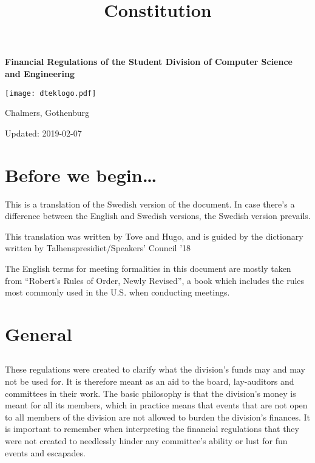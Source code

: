 \documentclass[a4paper]{dtek}
\title{Constitution}
\newcommand{\sdocsae}{Student Division of Computer Science and Engineering~}
\newcommand{\updated}{2019-02-07} %
\begin{document}
\makeheadfoot

\vspace*{\fill}
\begin{center}
{\Huge \textbf{Financial Regulations of the \sdocsae}}
\par\bigskip
\texttt{[image: dteklogo.pdf]}
\par\bigskip
{\LARGE Chalmers, Gothenburg}
\end{center}
\vspace*{\fill}
\begin{center}
{\LARGE Updated: \updated}
\end{center}
\vspace*{\fill}


\newpage
\setcounter{tocdepth}{1}
\tableofcontents
\newpage


\setcounter{section}{-1}
\section{Before we begin\dots}
This is a translation of the Swedish version of the document. In case there's a difference between the English and Swedish versions, the Swedish version prevails.

This translation was written by Tove and Hugo, and is guided by the dictionary written by Talhenspresidiet/Speakers' Council '18

The English terms for meeting formalities in this document are mostly taken from ``Robert's Rules of Order, Newly Revised'', a book which includes the rules most commonly used in the U.S. when conducting meetings.

\newpage

\section{General}
\subsection{}

These regulations were created to clarify what the division's funds may and may not be used for. It is therefore meant as an aid to the board, lay-auditors and committees in their work. The basic philosophy is that the division's money is meant for all its members, which in practice means that events that are not open to all members of the division are not allowed to burden the division's finances. It is important to remember when interpreting the financial regulations that they were not created to needlessly hinder any committee's ability or lust for fun events and escapades. 
\end{document}
